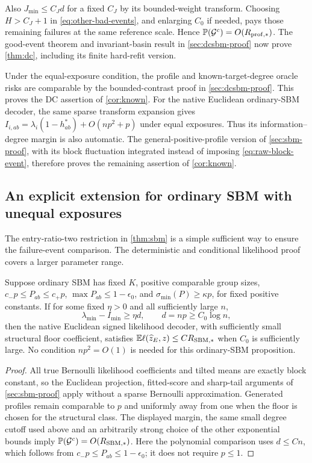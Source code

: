 Also $J_{\min}\le C_Jd$ for a fixed $C_J$ by its bounded-weight transform.
Choosing $H>C_J+1$ in \eqref{eq:other-bad-events}, and enlarging $C_0$ if
needed, pays those remaining failures at the same reference scale.
Hence $\mathbb P(\mathcal G^c)=O(R_{\mathrm{prof},*})$.
The good-event theorem and invariant-basin result in
\cref{sec:dcsbm-proof} now prove \cref{thm:dc}, including its finite
hard-refit version.

Under the equal-exposure condition, the profile and known-target-degree
oracle risks are comparable by the bounded-contrast proof in
\cref{sec:dcsbm-proof}. This proves the DC assertion of \cref{cor:known}.
For the native Euclidean ordinary-SBM decoder, the same sparse transform
expansion gives
$I_{i,ab}=\lambda_i(1-h_{ab}^*)+O(np^2+p)$ under equal exposures.
Thus its information--degree margin is also automatic.
The general-positive-profile version of \cref{sec:sbm-proof}, with its
block fluctuation integrated instead of imposing \eqref{eq:raw-block-event},
therefore proves the remaining assertion of \cref{cor:known}.

\subsection{An explicit extension for ordinary SBM with unequal exposures}

The entry-ratio-two restriction in \cref{thm:sbm} is a simple sufficient
way to ensure the failure-event comparison. The deterministic and
conditional likelihood proof covers a larger parameter range.

\begin{proposition}
\label{prop:sbm-margin}
Suppose ordinary SBM has fixed $K$, positive comparable group sizes,
$c_-p\le P_{ab}\le c_+p$, $\max P_{ab}\le1-\epsilon_0$,
and $\sigma_{\min}(P)\ge\kappa p$, for fixed positive constants.
If for some fixed $\eta>0$ and all sufficiently large $n$,
\[
 \lambda_{\min}-I_{\min}\ge\eta d,\qquad d=np\ge C_0\log n,
\]
then the native Euclidean signed likelihood decoder, with sufficiently
small structural floor coefficient, satisfies
$\mathbb E\ell(\widehat z_E,z)\le C R_{\mathrm{SBM},*}$
when $C_0$ is sufficiently large. No condition $np^2=O(1)$ is needed
for this ordinary-SBM proposition.
\end{proposition}

\begin{proof}
All true Bernoulli likelihood coefficients and tilted means are exactly
block constant, so the Euclidean projection, fitted-score and sharp-tail
arguments of \cref{sec:sbm-proof} apply without a sparse Bernoulli
approximation. Generated profiles remain comparable to $p$ and uniformly
away from one when the floor is chosen for the structural class.
The displayed margin, the same small degree cutoff used above and an
arbitrarily strong choice of the other exponential bounds imply
$\mathbb P(\mathcal G^c)=O(R_{\mathrm{SBM},*})$.
Here the polynomial comparison uses $d\le Cn$, which follows from
$c_-p\le P_{ab}\le1-\epsilon_0$; it does not require $p\le1$.
\end{proof}

